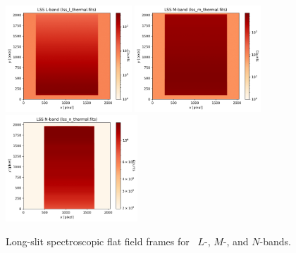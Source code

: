 \begin{figure}[!ht]
\centering
  \includegraphics[height=4cm,keepaspectratio]{figures/LSS_CrtAlg_files/lss_l_thermal.fits.png}
  \includegraphics[height=4cm,keepaspectratio]{figures/LSS_CrtAlg_files/lss_m_thermal.fits.png}
  \includegraphics[height=4cm,keepaspectratio]{figures/LSS_CrtAlg_files/lss_n_thermal.fits.png}
  \caption[LSS flat field frames]{Long-slit spectroscopic flat field frames for \lss~$L$-, $M$-, and $N$-bands.} 
  \label{fig:ff}
\end{figure}

